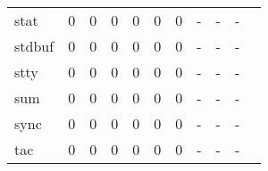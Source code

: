 \begin{longtable}{lp{1.2cm}p{1.2cm}p{1.2cm}p{1.2cm}p{1.2cm}p{1.2cm}p{1.2cm}p{1.2cm}p{1.2cm}p{1.2cm}}
stat      &                                     0 &                                                  0 &                                                  0 &                                                  0 &                                                  0 &                                                  0 &                                             - &                                                  - &                                                  - \\
stdbuf    &                                     0 &                                                  0 &                                                  0 &                                                  0 &                                                  0 &                                                  0 &                                             - &                                                  - &                                                  - \\
stty      &                                     0 &                                                  0 &                                                  0 &                                                  0 &                                                  0 &                                                  0 &                                             - &                                                  - &                                                  - \\
sum       &                                     0 &                                                  0 &                                                  0 &                                                  0 &                                                  0 &                                                  0 &                                             - &                                                  - &                                                  - \\
sync      &                                     0 &                                                  0 &                                                  0 &                                                  0 &                                                  0 &                                                  0 &                                             - &                                                  - &                                                  - \\
tac       &                                     0 &                                                  0 &                                                  0 &                                                  0 &                                                  0 &                                                  0 &                                             - &                                                  - &                                                  - \\

\end{longtable}

